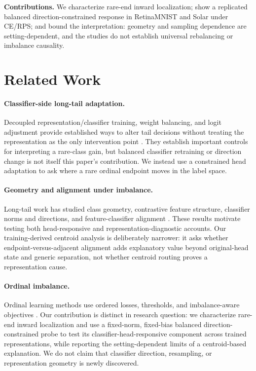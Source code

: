 \textbf{Contributions.} We characterize rare-end inward localization; show a replicated balanced direction-constrained response in RetinaMNIST and Solar under CE/RPS; and bound the interpretation: geometry and sampling dependence are setting-dependent, and the studies do not establish universal rebalancing or imbalance causality.

\section{Related Work}
\paragraph{Classifier-side long-tail adaptation.} Decoupled representation/classifier training, weight balancing, and logit adjustment provide established ways to alter tail decisions without treating the representation as the only intervention point \citep{kang2020decoupling,alshammari2022weight,menon2021logit}. They establish important controls for interpreting a rare-class gain, but balanced classifier retraining or direction change is not itself this paper's contribution. We instead use a constrained head adaptation to ask where a rare ordinal endpoint moves in the label space.

\paragraph{Geometry and alignment under imbalance.} Long-tail work has studied class geometry, contrastive feature structure, classifier norms and directions, and feature-classifier alignment \citep{c2am2022angular,zhu2022balanced,yi2025geometry,wang2026alignment}. These results motivate testing both head-responsive and representation-diagnostic accounts. Our training-derived centroid analysis is deliberately narrower: it asks whether endpoint-versus-adjacent alignment adds explanatory value beyond original-head state and generic separation, not whether centroid routing proves a representation cause.

\paragraph{Ordinal imbalance.} Ordinal learning methods use ordered losses, thresholds, and imbalance-aware objectives \citep{zhu2019smor,lazaro2023bayesian}. Our contribution is distinct in research question: we characterize rare-end inward localization and use a fixed-norm, fixed-bias balanced direction-constrained probe to test its classifier-head-responsive component across trained representations, while reporting the setting-dependent limits of a centroid-based explanation. We do not claim that classifier direction, resampling, or representation geometry is newly discovered.

